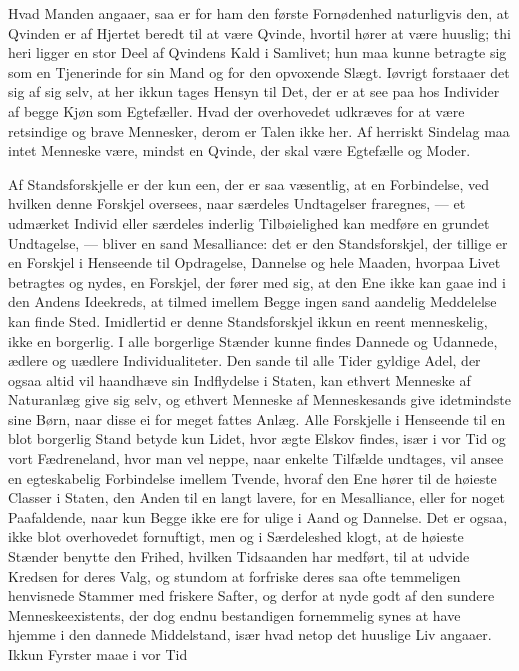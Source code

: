 \documentclass[12pt,a4paper]{book}
\newcommand{\apage}[1]{\marginnote{\footnotesize\textit{[#1]}}}
\begin{document}
Hvad Manden angaaer, saa er for ham den første Fornødenhed naturligvis
den, at Qvinden er af Hjertet beredt til at være Qvinde, hvortil hører
at være huuslig; thi heri ligger en stor Deel af Qvindens Kald i
Samlivet; hun maa kunne betragte sig som en Tjenerinde for sin Mand og
for den opvoxende Slægt. Iøvrigt forstaaer det sig af sig selv, at her
ikkun tages Hensyn til Det, der er at see paa hos Individer af begge
Kjøn som Egtefæller. Hvad der overhovedet udkræves for at være
retsindige og brave Mennesker, derom er Talen ikke her. Af herriskt
Sindelag maa \apage{90} intet Menneske være, mindst en Qvinde, der skal være
Egtefælle og Moder.

Af Standsforskjelle er der kun een, der er saa væsentlig, at en
Forbindelse, ved hvilken denne Forskjel oversees, naar særdeles
Undtagelser fraregnes, --- et udmærket Individ eller særdeles inderlig
Tilbøielighed kan medføre en grundet Undtagelse, --- bliver en sand
Mesalliance: det er den Standsforskjel, der tillige er en Forskjel i
Henseende til Opdragelse, Dannelse og hele Maaden, hvorpaa Livet
betragtes og nydes, en Forskjel, der fører med sig, at den Ene ikke kan
gaae ind i den Andens Ideekreds, at tilmed imellem Begge ingen sand
aandelig Meddelelse kan finde Sted. Imidlertid er denne Standsforskjel
ikkun en reent menneskelig, ikke en borgerlig. I alle borgerlige
Stænder kunne findes Dannede og Udannede, ædlere og uædlere
Individualiteter. Den sande til alle Tider gyldige Adel, der ogsaa altid
vil haandhæve sin Indflydelse i Staten, kan ethvert Menneske af
Naturanlæg give sig selv, og ethvert Menneske af Menneskesands give
idetmindste sine Børn, naar disse ei for meget fattes Anlæg. Alle
Forskjelle i Henseende til en blot borgerlig Stand betyde kun Lidet,
hvor ægte Elskov findes, især i vor Tid og vort Fædreneland, hvor man
vel neppe, naar enkelte Tilfælde undtages, vil ansee en egteskabelig
Forbindelse imellem Tvende, hvoraf den Ene hører til de høieste Classer
i Staten, den Anden til en langt lavere, for en Mesalliance, eller for
noget Paafaldende, naar \apage{91} kun Begge ikke ere for ulige i Aand og Dannelse.
Det er ogsaa, ikke blot overhovedet fornuftigt, men og i Særdeleshed
klogt, at de høieste Stænder benytte den Frihed, hvilken Tidsaanden har
medført, til at udvide Kredsen for deres Valg, og stundom at forfriske
deres saa ofte temmeligen henvisnede Stammer med friskere Safter, og
derfor at nyde godt af den sundere Menneskeexistents, der dog endnu
bestandigen fornemmelig synes at have hjemme i den dannede Middelstand,
især hvad netop det huuslige Liv angaaer. Ikkun Fyrster maae i vor Tid
\end{document}

